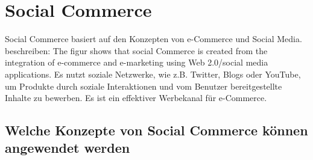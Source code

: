 \section{Social Commerce}

Social Commerce basiert auf den Konzepten von e-Commerce und Social Media. \textcite[S. 8]{turban:sc} beschreiben: \glqq{}The figur shows that social Commerce is created from the integration of e-commerce and e-marketing using  Web 2.0/social media applications.\grqq{} Es nutzt soziale Netzwerke, wie z.B. Twitter, Blogs oder YouTube, um Produkte durch soziale Interaktionen und vom Benutzer bereitgestellte Inhalte zu bewerben. Es ist ein effektiver Werbekanal für e-Commerce.


\subsection{Welche Konzepte von Social Commerce können angewendet werden}

